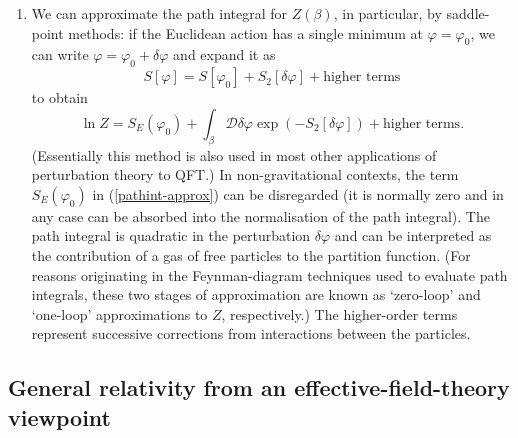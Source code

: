 \documentclass[12pt]{article}
\newcommand{\mc}[1]{\ensuremath{\mathcal{#1}}}
\newcommand{\be}{\begin{equation}}
\newcommand{\ee}{\end{equation}}
\begin{document}
\begin{enumerate}
\item We can approximate the path integral for $Z(\beta)$, in particular, by saddle-point methods: if the Euclidean action has a single minimum at $\varphi=\varphi_0$, we can write $\varphi = \varphi_0 + \delta \varphi$ and expand it as
\be
S[\varphi]=S[\varphi_0] + S_2[\delta \varphi] + \mbox{higher terms}
\ee
to obtain
\be \label{pathint-approx}
\ln Z = S_E(\varphi_0) + \int_\beta \mc{D}\delta\varphi \exp(- S_2[\delta \varphi]) + \mbox{higher terms}.
\ee
(Essentially this method is also used in most other applications of perturbation theory to QFT.) 
In non-gravitational contexts, the term $S_E(\varphi_0)$ in (\ref{pathint-approx}) can be disregarded (it is normally zero and in any case can be absorbed into the normalisation of the path integral). The path integral is quadratic in the perturbation $\delta \varphi$ and can be interpreted as the contribution of a gas of free particles to the partition function. (For reasons originating in the Feynman-diagram techniques used to evaluate path integrals, these two stages of approximation are known as `zero-loop' and `one-loop' approximations to $Z$, respectively.) The higher-order terms represent successive corrections from interactions between the particles.
\end{enumerate}

\subsection{General relativity from an effective-field-theory viewpoint}
\end{document}

